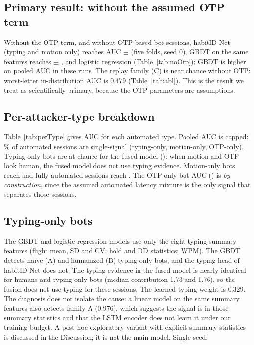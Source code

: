 \documentclass[conference]{IEEEtran}
\begin{document}
\subsection{Primary result: without the assumed OTP term}
Without the OTP term, and without OTP-based bot sessions, habitID-Net (typing and motion only) reaches AUC \NoOtpAuc{} $\pm$ \NoOtpAucSd{} (five folds, seed 0), GBDT on the same features reaches \GbtNoOtpAuc{} $\pm$ \GbtNoOtpAucSd{}, and logistic regression \LrNoOtpAuc{} (Table~\ref{tab:noOtp}); GBDT is higher on pooled AUC in these runs.
 The replay family (C) is near chance without OTP: worst-letter in-distribution AUC is 0.479 (Table~\ref{tab:abl}). This is the result we treat as scientifically primary, because the OTP parameters are assumptions.

\subsection{Per-attacker-type breakdown}

Table~\ref{tab:perType} gives AUC for each automated type. Pooled AUC is capped: \ShareSingleSignal\% of automated sessions are single-signal (typing-only, motion-only, OTP-only). Typing-only bots are at chance for the fused model (\PerTypeFullTyping{}): when motion and OTP look human, the fused model does not use typing evidence. Motion-only bots reach \PerTypeFullMotion{} and fully automated sessions reach \PerTypeFullAll{}. The OTP-only bot AUC (\PerTypeFullOtp{}) is \emph{by construction}, since the assumed automated latency mixture is the only signal that separates those sessions.



\subsection{Typing-only bots}

The GBDT and logistic regression models use only the eight typing summary features (flight mean, SD and CV; hold and DD statistics; WPM). The GBDT detects naive (A) and humanized (B) typing-only bots, and the typing head of habitID-Net does not. The typing evidence in the fused model is nearly identical for humans and typing-only bots (median contribution 1.73 and 1.76), so the fusion does not use typing for these sessions. The learned typing weight is 0.329. The diagnosis does not isolate the cause: a linear model on the same summary features also detects family A (0.976), which suggests the signal is in those summary statistics and that the LSTM encoder does not learn it under our training budget. A post-hoc exploratory variant with explicit summary statistics is discussed in the Discussion; it is not the main model. Single seed.
\end{document}

